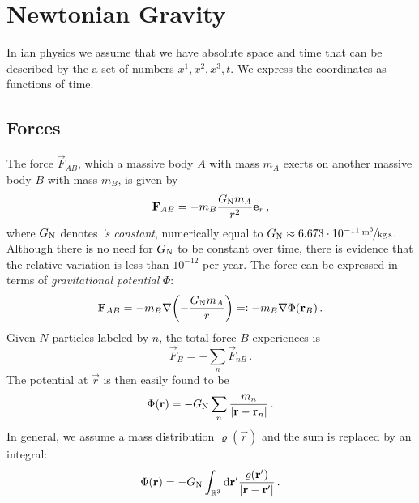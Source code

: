 \chapter{Newtonian Gravity}
In ian physics we assume that we have absolute space and time
that can be described by the a set of numbers $x^1,x^2,x^3,t$.
We express the coordinates as functions of time.
\section{Forces}
The force $\vec{F}_{AB}$, which a massive body $A$ with mass $m_A$ exerts on another massive body $B$ with mass $m_B$, is given by
\begin{equation}
    \vec{F}_{AB}=-m_B\frac{G\textsubscript{N}m_A}{r^2}\vec{e}_r\, ,
\end{equation}
where $G\textsubscript{N}$ denotes \emph{'s constant},
numerically equal to $G\textsubscript{N}\approx \unitfrac[6.673\cdot 10^{-11}]{m^3}{kg\,s}$.
Although there is no need for $G\textsubscript{N}$ to be constant over time,
there is evidence that the relative variation is less than $10^{-12}$ per year.
The force can be expressed in terms of \emph{gravitational potential} $\Phi$:
\begin{equation}
    \vec{F}_{AB}=-m_B\nabla\left(-\frac{G\textsubscript{N}m_A}{r}\right)=:
    -m_B\nabla\Phi(\vec{r}_B)\, .
\end{equation}
Given $N$ particles labeled by $n$, the total force $B$ experiences is
\begin{equation}
    \vec{F}_{B}=-\sum_n \vec{F}_{nB}\, .
\end{equation}
The potential at $\vec{r}$ is then easily found to be
\begin{equation}
    \Phi(\vec{r})=-G\textsubscript{N}\sum_n\frac{m_n}{|\vec{r}-\vec{r}_n|}\, .
\end{equation}
In general, we assume a mass distribution $\varrho(\vec{r})$ and the sum is
replaced by an integral:
\begin{equation}
    \Phi(\vec{r}) = -G\textsubscript{N}\int_{\Reals^3}\dif{\vec{r}^{\prime}}
    \frac{\varrho(\vec{r}^{\prime})}{|\vec{r}-\vec{r}^{\prime}|}\,.
\end{equation}
